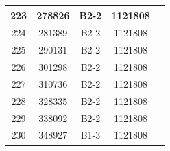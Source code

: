 \documentclass[UTF8,10pt,a4paper,fontset=fandol]{ctexart}
\newcommand{\fieldvalue}[1]{#1}
\begin{document}
\begin{center}
\begin{tabular}{|c|c|c|c|c|}
223 &
\fieldvalue{278826} &
\fieldvalue{B2-2} &
\fieldvalue{1121808} & \\ \hline
224 &
\fieldvalue{281389} &
\fieldvalue{B2-2} &
\fieldvalue{1121808} & \\ \hline
225 &
\fieldvalue{290131} &
\fieldvalue{B2-2} &
\fieldvalue{1121808} & \\ \hline
226 &
\fieldvalue{301298} &
\fieldvalue{B2-2} &
\fieldvalue{1121808} & \\ \hline
227 &
\fieldvalue{310736} &
\fieldvalue{B2-2} &
\fieldvalue{1121808} & \\ \hline
228 &
\fieldvalue{328335} &
\fieldvalue{B2-2} &
\fieldvalue{1121808} & \\ \hline
229 &
\fieldvalue{338092} &
\fieldvalue{B2-2} &
\fieldvalue{1121808} & \\ \hline
230 &
\fieldvalue{348927} &
\fieldvalue{B1-3} &
\fieldvalue{1121808} & \\ \hline

\end{tabular}
\end{center}
\end{document}
